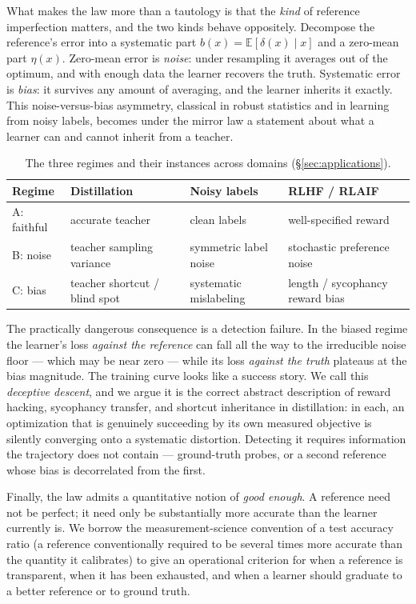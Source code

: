 \documentclass[10pt]{article} %
\theoremstyle{plain}
\theoremstyle{remark}
\newcommand{\E}{\mathbb{E}}
\begin{document}
What makes the law more than a tautology is that the \emph{kind} of reference imperfection matters, and the two kinds behave oppositely. Decompose the reference's error into a systematic part $b(x) = \E[\delta(x)\mid x]$ and a zero-mean part $\eta(x)$. Zero-mean error is \emph{noise}: under resampling it averages out of the optimum, and with enough data the learner recovers the truth. Systematic error is \emph{bias}: it survives any amount of averaging, and the learner inherits it exactly. This noise-versus-bias asymmetry, classical in robust statistics and in learning from noisy labels, becomes under the mirror law a statement about what a learner can and cannot inherit from a teacher.

\begin{table}[h]
\centering\small
\caption{The three regimes and their instances across domains (\S\ref{sec:applications}).}
\label{tab:regimes-map}
\begin{tabular}{llll}
\hline
Regime & Distillation & Noisy labels & RLHF / RLAIF \\
\hline
A: faithful & accurate teacher & clean labels & well-specified reward \\
B: noise & teacher sampling variance & symmetric label noise & stochastic preference noise \\
C: bias & teacher shortcut / blind spot & systematic mislabeling & length / sycophancy reward bias \\
\hline
\end{tabular}
\end{table}

The practically dangerous consequence is a detection failure. In the biased regime the learner's loss \emph{against the reference} can fall all the way to the irreducible noise floor --- which may be near zero --- while its loss \emph{against the truth} plateaus at the bias magnitude. The training curve looks like a success story. We call this \emph{deceptive descent}, and we argue it is the correct abstract description of reward hacking, sycophancy transfer, and shortcut inheritance in distillation: in each, an optimization that is genuinely succeeding by its own measured objective is silently converging onto a systematic distortion. Detecting it requires information the trajectory does not contain --- ground-truth probes, or a second reference whose bias is decorrelated from the first.

Finally, the law admits a quantitative notion of \emph{good enough}. A reference need not be perfect; it need only be substantially more accurate than the learner currently is. We borrow the measurement-science convention of a test accuracy ratio (a reference conventionally required to be several times more accurate than the quantity it calibrates) to give an operational criterion for when a reference is transparent, when it has been exhausted, and when a learner should graduate to a better reference or to ground truth.
\end{document}
